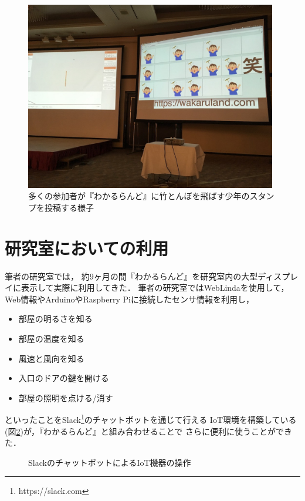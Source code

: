 \begin{figure}[H]
\centering
\includegraphics[width=11cm]{images/taketombo.png}
\caption{多くの参加者が『わかるらんど』に竹とんぼを飛ばす少年のスタンプを投稿する様子}
\label{taketombo}
\end{figure}


\section{研究室においての利用}
筆者の研究室では，
約9ヶ月の間『わかるらんど』を研究室内の大型ディスプレイに表示して実際に利用してきた．
筆者の研究室ではWebLindaを使用して，
Web情報やArduinoやRaspberry Piに接続したセンサ情報を利用し，
\begin{itemize}
\item 部屋の明るさを知る
\item 部屋の温度を知る
\item 風速と風向を知る
\item 入口のドアの鍵を開ける
\item 部屋の照明を点ける/消す
\end{itemize}
といったことをSlack\footnote{https://slack.com}のチャットボットを通じて行える
IoT環境を構築している(図\ref{slack})が，『わかるらんど』と組み合わせることで
さらに便利に使うことができた．

\begin{figure}[H]
\centering
{}
\caption{SlackのチャットボットによるIoT機器の操作}
\label{slack}
\end{figure}

